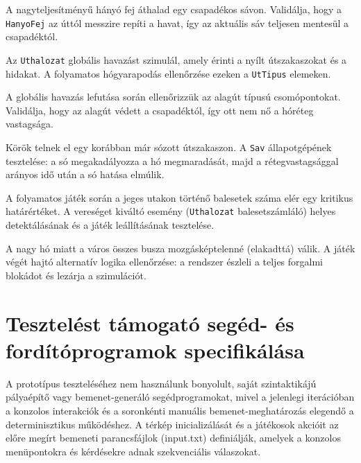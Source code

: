 {A nagyteljesítményű hányó fej áthalad egy csapadékos sávon.}
{Validálja, hogy a \texttt{HanyoFej} az úttól messzire repíti a havat, így az aktuális sáv teljesen mentesül a csapadéktól.}


{Az \texttt{Uthalozat} globális havazást szimulál, amely érinti a nyílt útszakaszokat és a hidakat.}
{A folyamatos hógyarapodás ellenőrzése ezeken a \texttt{UtTipus} elemeken.}

{A globális havazás lefutása során ellenőrizzük az alagút típusú csomópontokat.}
{Validálja, hogy az alagút védett a csapadéktól, így ott nem nő a hóréteg vastagsága.}

{Körök telnek el egy korábban már sózott útszakaszon.}
{A \texttt{Sav} állapotgépének tesztelése: a só megakadályozza a hó megmaradását, majd a rétegvastagsággal arányos idő után a só hatása elmúlik.}

{A folyamatos játék során a jeges utakon történő balesetek száma elér egy kritikus határértéket.}
{A vereséget kiváltó esemény (\texttt{Uthalozat} balesetszámláló) helyes detektálásának és a játék leállításának tesztelése.}

{A nagy hó miatt a város összes busza mozgásképtelenné (elakadttá) válik.}
{A játék végét hajtó alternatív logika ellenőrzése: a rendszer észleli a teljes forgalmi blokádot és lezárja a szimulációt.}

\section{Tesztelést támogató segéd- és fordítóprogramok specifikálása}

A prototípus teszteléséhez nem használunk bonyolult, saját szintaktikájú pályaépítő vagy bemenet-generáló segédprogramokat, mivel a jelenlegi iterációban a konzolos interakciók és a soronkénti manuális bemenet-meghatározás elegendő a determinisztikus működéshez. A térkép inicializálását és a játékosok akcióit az előre megírt bemeneti parancsfájlok (input.txt) definiálják, amelyek a konzolos menüpontokra és kérdésekre adnak szekvenciális válaszokat.


